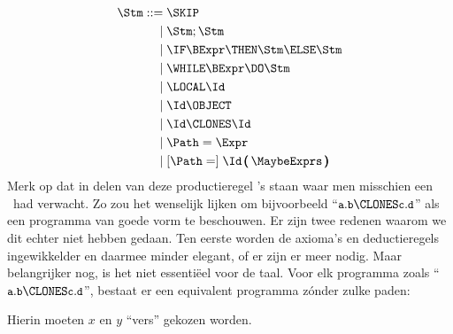 %
\begin{align*}
  \Stm \GrammarDef \SKIP \\
  \GrammarOr \Stm; \Stm \\
  \GrammarOr \IF \BExpr \THEN \Stm \ELSE \Stm \\
  \GrammarOr \WHILE \BExpr \DO \Stm \\
  \GrammarOr \LOCAL \Id \\
  \GrammarOr \Id \OBJECT \\
  \GrammarOr \Id \CLONES \Id \\
  \GrammarOr \Path = \Expr \\
  \GrammarOr \GrammarOpt{\Path =} \Id\,\pmb{(}\,\MaybeExprs\,\pmb{)}
\end{align*}
%
Merk op dat in delen van deze productieregel \Id's staan waar men misschien een \Path\ had verwacht. Zo zou het wenselijk lijken om bijvoorbeeld ``$\id{a}.\id{b} \CLONES \id{c}.\id{d}$'' als een programma van goede vorm te beschouwen. Er zijn twee redenen waarom we dit echter niet hebben gedaan. Ten eerste worden de axioma's en deductieregels ingewikkelder en daarmee minder elegant, of er zijn er meer nodig. Maar belangrijker nog, is het niet essentiëel voor de taal. Voor elk programma zoals ``$\id{a}.\id{b} \CLONES \id{c}.\id{d}$'', bestaat er een equivalent programma zónder zulke paden:

\begin{minipage}[t]{.5\textwidth}
  \newCodeFragment
\end{minipage}
\begin{minipage}[t]{.5\textwidth}
  \newCodeFragment
\end{minipage}

Hierin moeten $x$ en $y$ ``vers'' gekozen worden.

